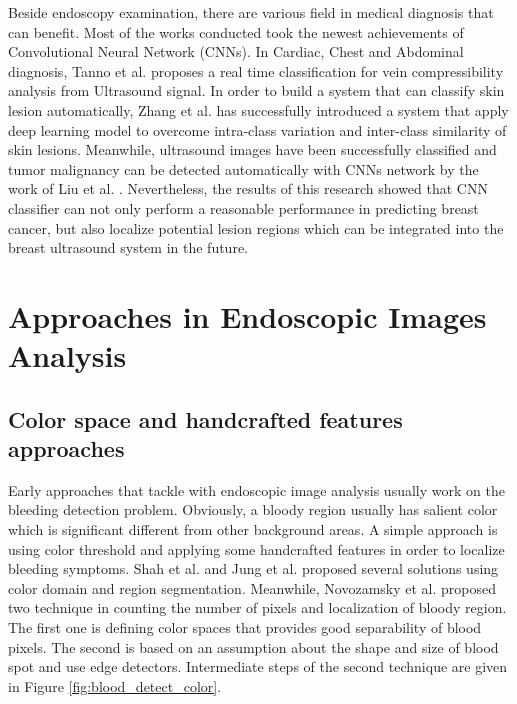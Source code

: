 Beside  endoscopy examination, there are various field in medical diagnosis that can benefit. Most of the works conducted took the newest achievements of Convolutional Neural Network (CNNs). In Cardiac, Chest and Abdominal diagnosis, Tanno et al. \cite{Tanno} proposes a real time classification for vein compressibility analysis from Ultrasound signal. In order to build a system that can classify skin lesion automatically, Zhang et al. \cite{Zhang} has successfully introduced a system that apply deep learning model to overcome intra-class variation and inter-class similarity of skin lesions. Meanwhile, ultrasound images have been successfully classified and tumor malignancy can be detected automatically with CNNs network by the work of Liu et al. \cite{10.1007/978-3-030-00934-2_96}. Nevertheless, the results of this research showed that CNN classifier can not only perform a reasonable performance in predicting breast cancer, but also localize potential lesion regions which can be integrated into the breast ultrasound system in the future.


\section{Approaches in Endoscopic Images Analysis}
\subsection{Color space and handcrafted features approaches}
Early approaches that tackle with endoscopic image analysis usually work on the bleeding detection problem. Obviously, a bloody region usually has salient color which is significant different from other background areas. A simple approach is using color threshold and applying some handcrafted features in order to localize bleeding symptoms. Shah et al.\cite{HSIColorDomain} and Jung et al.\cite{active_blood_detect} proposed several solutions using color domain and region segmentation. Meanwhile, Novozamsky et al. \cite{blood_detection_color} proposed two technique in counting the number of pixels and localization of bloody region. The first one is defining color spaces that provides good separability of blood pixels. The second is based on an assumption about the shape and size of blood spot and use edge detectors.
Intermediate steps of the second technique are given  
in Figure \ref{fig:blood_detect_color}.


